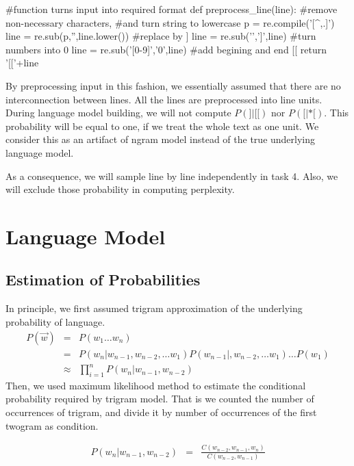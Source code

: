 \documentclass{article}
\begin{document}
\begin{python}

#function turns input into required format
def preprocess_line(line):
    #remove non-necessary characters, 
    #and turn string to lowercase
    p = re.compile('[^\w\s,.]')
    line = re.sub(p,'',line.lower())
    #replace \n by ]
    line = re.sub('\n',']',line)
    #turn numbers into 0
    line = re.sub('[0-9]','0',line)
    #add begining and end [[
    return '[['+line
\end{python}
\label{indep}By preprocessing input in this fashion, we essentially assumed that there are no interconnection between lines. All the lines are preprocessed into line units. During language model building, we will not compute $P(]|[[)$ nor  $P([|*[)$. This probability will be equal to one, if we treat the whole text as one unit. We consider this as an artifact of ngram model instead of the true underlying language model.

As a consequence, we will sample line by line independently in task 4. Also, we will exclude those probability in computing perplexity.

\section{Language Model}

\subsection{Estimation of Probabilities}
In principle, we first assumed trigram approximation of the underlying probability of language.
\begin{eqnarray*}
	P(\vec{w}) &=& P(w_1\dots w_n)  \\
	&=& P(w_n|w_{n-1},w_{n-2},\dots w_1)P(w_{n-1}|,w_{n-2},\dots w_1)\dots P(w_1)  \\
		&\approx& {\prod_{i=1}^{n} P(w_n|w_{n-1},w_{n-2}) }
\end{eqnarray*}
Then, we used maximum likelihood method to estimate the conditional probability required by trigram model. That is we counted the number of occurrences of trigram, and divide it by number of occurrences of the first twogram as condition. 

\begin{eqnarray*}
	P(w_n|w_{n-1},w_{n-2}) &=& \frac{C(w_{n-2},w_{n-1},w_n)}{C(w_{n-2},w_{n-1})}
\end{eqnarray*}
\end{document}
